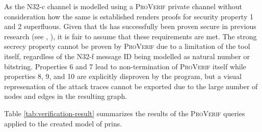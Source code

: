 As the N32-c channel is modelled using a \textsc{ProVerif} private channel without consideration how the same is established renders proofs for security property 1 and 2 superfluous.
Given that \gls{tls} has successfully been proven secure in previous research (see \cite{cremers2017comprehensive}, \cite{van2018analysis}), it is fair to assume that these requirements are met.
The strong secrecy property cannot be proven by \textsc{ProVerif} due to a limitation of the tool itself, regardless of the N32-f message ID being modelled as natural number or bitstring.
Properties 6 and 7 lead to non-termination of \textsc{ProVerif} itself while properties 8, 9, and 10 are explicitly disproven by the program, but a visual represenation of the attack traces cannot be exported due to the large number of nodes and edges in the resulting graph.

Table \ref{tab:verification-result} summarizes the results of the \textsc{ProVerif} queries applied to the created model of \gls{prins}.


